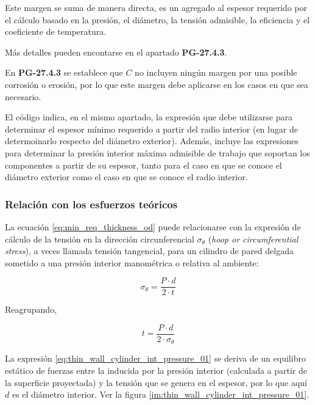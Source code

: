 \begin{itemize}
     Este margen se suma de manera directa, es un agregado al espesor requerido por el cálculo basado en la presión, el diámetro, la tensión admisible, la eficiencia y el coeficiente de temperatura.

     Más detalles pueden encontarse en el apartado \textbf{PG-27.4.3}.

\end{itemize}

En \textbf{PG-27.4.3} se establece que $C$ no incluyen ningún margen por una posible corrosión o erosión, por lo que este margen debe aplicarse en los casos en que sea necesario.

El código indica, en el mismo apartado, la expresión que debe utilizarse para determinar el espesor mínimo requerido a partir del radio interior (en lugar de determoinarlo respecto del diámetro exterior). Además, incluye las expresiones para determinar la presión interior máxima admisible de trabajo que soportan los componentes a partir de su espesor, tanto para el caso en que se conoce el diámetro exterior como el caso en que se conoce el radio interior.

\subsubsection{Relación con los esfuerzos teóricos}

La ecuación \ref{eq:min_req_thickness_od} puede relacionarse con la expresión de cálculo de la tensión en la dirección circunferencial $\sigma_{\theta}$ (\textit{hoop or circumferential stress}), a veces llamada tensión tangencial, para un cilindro de pared delgada sometido a una presión interior manométrica o relativa al ambiente:

\begin{equation}
     \sigma_{\theta}=\frac{P \cdot d}{\num{2} \cdot t}
     \label{eq:thin_wall_cylinder_int_pressure_01}
\end{equation}

Reagrupando,

\begin{equation}
     t=\frac{P \cdot d}{\num{2} \cdot \sigma_{\theta}}
     \label{eq:thin_wall_cylinder_int_pressure_02}
\end{equation}

La expresión \ref{eq:thin_wall_cylinder_int_pressure_01} se deriva de un equilibro estático de fuerzas entre la inducida por la presión interior (calculada a partir de la superficie proyectada) y la tensión que se genera en el espesor, por lo que aquí $d$ es el diámetro interior. Ver la figura \ref{im:thin_wall_cylinder_int_pressure_01}.


